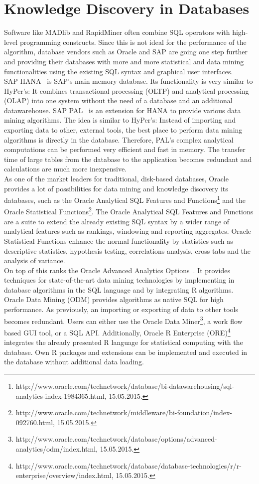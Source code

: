 \section{Knowledge Discovery in Databases}
Software like MADlib and RapidMiner often combine SQL operators with high-level programming constructs. Since this is not ideal for the performance of the algorithm, database vendors such as Oracle and SAP are going one step further and providing their databases with more and more statistical and data mining functionalities using the existing SQL syntax and graphical user interfaces.
\\
SAP HANA~\parencite{SAP} is SAP's main memory database. Its functionality is very similar to HyPer's: It combines transactional processing (OLTP) and analytical processing (OLAP) into one system without the need of a database and an additional datawarehouse. 
SAP PAL~\parencite{pal} is an extension for HANA to provide various data mining algorithms. The idea is similar to HyPer's: Instead of importing and exporting data to other, external tools, the best place to perform data mining algorithms is directly in the database. Therefore, PAL's complex analytical computations can be performed very efficient and fast in memory. The transfer time of large tables from the database to the application becomes redundant and calculations are much more inexpensive.
\\
As one of the market leaders for traditional, disk-based databases, Oracle provides a lot of possibilities for data mining and knowledge discovery its databases, such as the Oracle Analytical SQL Features and Functions\footnote{http://www.oracle.com/technetwork/database/bi-datawarehousing/sql-analytics-index-1984365.html, 15.05.2015.} and the Oracle Statistical Functions\footnote{http://www.oracle.com/technetwork/middleware/bi-foundation/index-092760.html, 15.05.2015.}. The Oracle Analytical SQL Features and Functions are a suite to extend the already existing SQL syntax by a wider range of analytical features such as rankings, windowing and reporting aggregates. Oracle Statistical Functions enhance the normal functionality by statistics such as descriptive statistics, hypothesis testing, correlations analysis, cross tabs and the analysis of variance. 
\\
On top of this ranks the Oracle Advanced Analytics Options~\parencite{oracle}. It provides techniques for state-of-the-art data mining technologies by implementing in database algorithms in the SQL language and by integrating R algorithms. Oracle Data Mining (ODM) provides algorithms as native SQL for high performance. As previously, an importing or exporting of data to other tools becomes redundant. Users can either use the Oracle Data Miner\footnote{http://www.oracle.com/technetwork/database/options/advanced-analytics/odm/index.html, 15.05.2015.}, a work flow based GUI tool, or a SQL API. Additionally, Oracle R Enterprise (ORE)\footnote{http://www.oracle.com/technetwork/database/database-technologies/r/r-enterprise/overview/index.html, 15.05.2015.} integrates the already presented R language for statistical computing with the database. Own R packages and extensions can be implemented and executed in the database without additional data loading.

